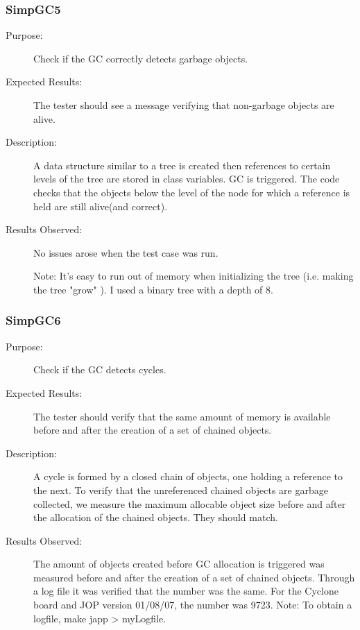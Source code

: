 \subsubsection{SimpGC5}

\begin{description}
    \item[Purpose:]
Check if the GC correctly detects garbage objects.
    \item[Expected Results:]
The tester should see a message verifying that non-garbage objects
are alive.
    \item[Description:]
A data structure similar to a tree is created then references to
certain levels of the tree are stored in class variables. GC is
triggered. The code checks that the objects below the level of the
node for which a reference is held are still alive(and correct).
    \item[Results Observed:]
No issues arose when the test case was run.

Note: It's easy to run out of memory when initializing the tree
(i.e. making the tree "grow" ). I used a binary tree with a depth of
8.

\end{description}

\subsubsection{SimpGC6}

\begin{description}
    \item[Purpose:]
Check if the GC detects cycles.
    \item[Expected Results:]
The tester should verify that the same amount of memory is available
before and after the creation of a set of chained objects.
    \item[Description:]
A cycle is formed by a closed chain of objects, one holding a
reference to the next. To verify that the unreferenced chained
objects are garbage collected, we measure the maximum allocable
object size before and after the allocation of the chained objects.
They should match.
    \item[Results Observed:]
The amount of objects created before GC allocation is triggered was
measured before and after the creation of a set of chained objects.
Through a log file it was verified that the number was the same. For
the Cyclone board and JOP version 01/08/07, the number was 9723.
Note: To obtain a logfile, make japp > myLogfile.

\end{description}
